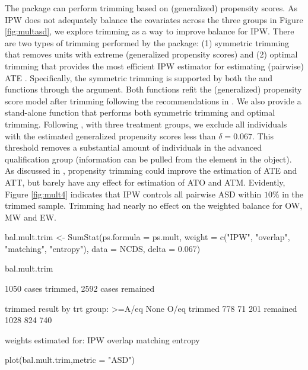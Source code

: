 The  package can perform trimming based on (generalized) propensity scores. As IPW does not adequately balance the covariates across the three groups in Figure \ref{fig:multasd}, we explore trimming as a way to improve balance for IPW. There are two types of trimming performed by the  package: (1) symmetric trimming that removes units with extreme (generalized propensity scores) \citep{Crump2009,Yoshida2019} and (2) optimal trimming that provides the most efficient IPW estimator for estimating (pairwise) ATE \citep{Crump2009,Yang2016}. Specifically, the symmetric trimming is supported by both the  and  functions through the  argument. Both functions refit the (generalized) propensity score model after trimming following the recommendations in \citet{LiThomasLi2018}. We also provide a stand-alone  function that performs both symmetric trimming and optimal trimming. Following \citet{Yoshida2019}, with three treatment groups, we exclude all individuals with the estimated generalized propensity scores less than $\delta=0.067$. This threshold removes a substantial amount of individuals in the advanced qualification group (information can be pulled from the  element in the  object). As discussed in \citet{Yoshida2019}, propensity trimming could improve the estimation of ATE and ATT, but barely have any effect for estimation of ATO and ATM. Evidently, Figure \ref{fig:mult4} indicates that IPW controls all pairwise ASD within $10\%$ in the trimmed sample. Trimming had nearly no effect on the weighted balance for OW, MW and EW.

\begin{example}
bal.mult.trim <- SumStat(ps.formula = ps.mult, weight = c("IPW", "overlap", "matching", 
    "entropy"), data = NCDS, delta = 0.067)

bal.mult.trim
\end{example}
 
\begin{Soutput}
1050 cases trimmed,  2592 cases remained 

trimmed result by trt group: 
         >=A/eq None O/eq
trimmed     778   71  201
remained   1028  824  740

weights estimated for:  IPW overlap matching entropy    
\end{Soutput}

\begin{example}
plot(bal.mult.trim,metric = "ASD")
\end{example}

